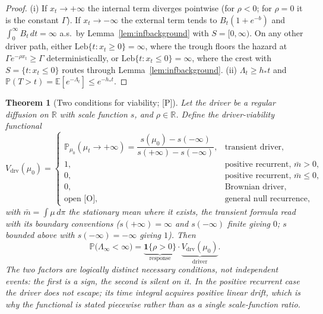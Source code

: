 \documentclass[11pt]{article}
\newtheorem{theorem}{Theorem}[section]
\theoremstyle{definition}
\theoremstyle{remark}
\newcommand{\PP}{\mathbb{P}}
\newcommand{\E}{\mathbb{E}}
\newcommand{\R}{\mathbb{R}}
\newcommand{\one}{\mathbf{1}}
\begin{document}

\begin{proof}
(i) If $x_t\to+\infty$ the internal term diverges pointwise (for
$\rho<0$; for $\rho=0$ it is the constant $\Gamma$). If
$x_t\to-\infty$ the external term tends to $B_t(1+e^{-b})$ and
$\int_0^\infty B_t\,dt=\infty$ a.s.\ by
Lemma~\ref{lem:infbackground} with $S=[0,\infty)$. On any other
driver path, either $\mathrm{Leb}\{t:x_t\ge0\}=\infty$, where the
trough floors the hazard at $\Gamma e^{-\rho x_t}\ge\Gamma$
deterministically, or $\mathrm{Leb}\{t:x_t\le0\}=\infty$, where the
crest with $S=\{t:x_t\le0\}$ routes through
Lemma~\ref{lem:infbackground}. (ii) $\Lambda_t\ge h_\ast t$ and
$\PP(T>t)=\E[e^{-\Lambda_t}]\le e^{-h_\ast t}$.
\end{proof}

\begin{theorem}[Two conditions for viability; {[P]}]\label{thm:twocond}
Let the driver be a regular diffusion on $\R$ with scale function $s$,
and $\rho\in\R$. Define the \emph{driver-viability functional}
\begin{equation}\label{eq:vdrv}
V_{\mathrm{drv}}(\mu_0)=
\begin{cases}
\PP_{\mu_0}(\mu_t\to+\infty)=\dfrac{s(\mu_0)-s(-\infty)}{s(+\infty)-s(-\infty)},
& \text{transient driver,}\\[8pt]
1, & \text{positive recurrent, }\bar m>0,\\[2pt]
0, & \text{positive recurrent, }\bar m\le0,\\[2pt]
0, & \text{Brownian driver,}\\[2pt]
\text{open [O]}, & \text{general null recurrence,}
\end{cases}
\end{equation}
with $\bar m=\int\mu\,d\pi$ the stationary mean where it exists, the
transient formula read with its boundary conventions ($s(+\infty)=\infty$
and $s(-\infty)$ finite giving $0$; $s$ bounded above with
$s(-\infty)=-\infty$ giving $1$). Then
\begin{equation}\label{eq:twocond}
\PP\bigl(\Lambda_\infty<\infty\bigr)
=\underbrace{\one\{\rho>0\}}_{\text{response}}
\cdot
\underbrace{V_{\mathrm{drv}}(\mu_0)}_{\text{driver}}.
\end{equation}
The two factors are logically distinct necessary conditions, not
independent events: the first is a sign, the second is silent on it.
In the positive recurrent case the driver does not escape; its time
integral acquires positive linear drift, which is why the functional
is stated piecewise rather than as a single scale-function ratio.
\end{theorem}
\end{document}
